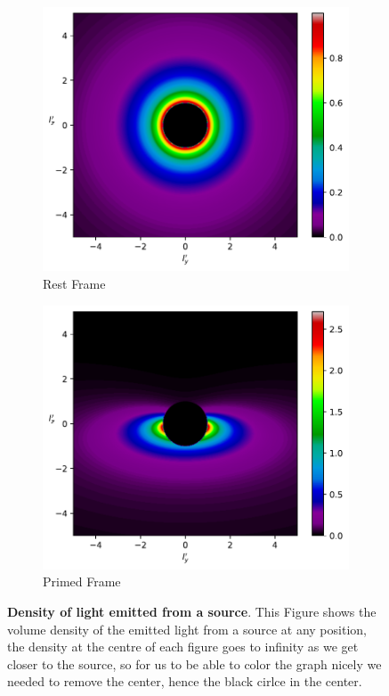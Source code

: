 \begin{figure}[H]
	\centering
	\begin{subfigure}{0.45\textwidth}
		\centering
		\includegraphics[width=\textwidth]{images/pdf/Density_of_Light_from_Rest_Source.pdf}
		\caption{Rest Frame}
		\label{subfig_1: Density of light emitted from a source}
	\end{subfigure}
	\begin{subfigure}{0.45\textwidth}
		\centering
		\includegraphics[width=\textwidth]{images/pdf/Density_of_Light_from_Moving_Source.pdf}
		\caption{Primed Frame}
		\label{subfig_2: Density of light emitted from a source}
	\end{subfigure}
	\caption{\textbf{Density of light emitted from a source}. This Figure shows the volume density of the emitted light from a source at any position, the density at the centre of each figure goes to infinity as we get closer to the source, so for us to be able to color the graph nicely we needed to remove the center, hence the black cirlce in the center.}
	\label{fig: Density of light emitted from a source}
\end{figure}

